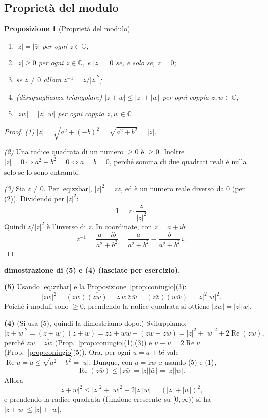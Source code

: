 \documentclass[11pt,a4paper]{article}
\newcommand{\CC}{\mathbb{C}}
\renewcommand{\Re}{\operatorname{Re}}
\theoremstyle{plain}
\newtheorem{prop}{Proposizione}[section]
\theoremstyle{definition}
\theoremstyle{remark}
\begin{document}
\subsection{Proprietà del modulo}

\begin{prop}[Proprietà del modulo]\label{prop:modulo}
\begin{enumerate}[label=(\arabic*)]
  \item $|z|=|\bar z|$ per ogni $z\in\CC$;
  \item $|z|\ge0$ per ogni $z\in\CC$, e $|z|=0$ se, e solo se, $z=0$;
  \item se $z\neq0$ allora $z^{-1}=\bar z/|z|^2$;
  \item (disuguaglianza triangolare) $|z+w|\le|z|+|w|$ per ogni coppia $z,w\in\CC$;
  \item $|zw|=|z|\,|w|$ per ogni coppia $z,w\in\CC$.
\end{enumerate}
\end{prop}

\begin{proof}
\emph{(1)} $|\bar z|=\sqrt{a^2+(-b)^2}=\sqrt{a^2+b^2}=|z|$.

\emph{(2)} Una radice quadrata di un numero $\ge0$ è $\ge0$. Inoltre
$|z|=0\iff a^2+b^2=0\iff a=b=0$, perché somma di due quadrati reali è nulla solo se lo sono entrambi.

\emph{(3)} Sia $z\neq0$. Per \eqref{eq:zzbar}, $|z|^2=z\bar z$, ed è un numero reale diverso da $0$ (per (2)).
Dividendo per $|z|^2$:
\[
  1=z\cdot\frac{\bar z}{|z|^2}
\]
Quindi $\bar z/|z|^2$ è l'inverso di $z$. In coordinate, con $z=a+ib$:
\[
  z^{-1}=\frac{a-ib}{a^2+b^2}=\frac{a}{a^2+b^2}-\frac{b}{a^2+b^2}\,i .
\]
\end{proof}

\par\medskip
\noindent\textbf{dimostrazione di (5) e (4) (lasciate per esercizio).}\par

\textbf{(5)} Usando \eqref{eq:zzbar} e la Proposizione~\ref{prop:coniugio}(3):
\[
  |zw|^2=(zw)\overline{(zw)}=z\,w\,\bar z\,\bar w=(z\bar z)(w\bar w)=|z|^2|w|^2 .
\]
Poiché i moduli sono $\ge0$, prendendo la radice quadrata si ottiene $|zw|=|z||w|$.

\textbf{(4)} (Si usa (5), quindi la dimostriamo dopo.) Sviluppiamo:
\[
  |z+w|^2=(z+w)(\bar z+\bar w)=z\bar z+w\bar w+(z\bar w+\bar z w)=|z|^2+|w|^2+2\Re(z\bar w),
\]
perché $\bar z w=\overline{z\bar w}$ (Prop.~\ref{prop:coniugio}(1),(3)) e $u+\bar u=2\Re u$ (Prop.~\ref{prop:coniugio}(5)).
Ora, per ogni $u=a+bi$ vale $\Re u=a\le\sqrt{a^2+b^2}=|u|$. Dunque, con $u=z\bar w$ e usando (5) e (1),
\[
  \Re(z\bar w)\le|z\bar w|=|z||\bar w|=|z||w| .
\]
Allora
\[
  |z+w|^2\le|z|^2+|w|^2+2|z||w|=(|z|+|w|)^2,
\]
e prendendo la radice quadrata (funzione crescente su $[0,\infty)$) si ha $|z+w|\le|z|+|w|$.
\end{document}
